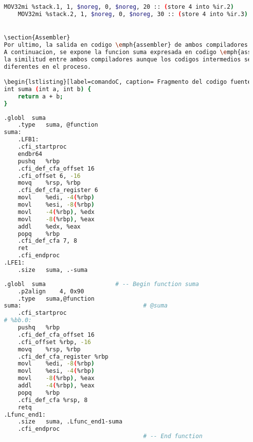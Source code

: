 \begin{lstlisting}[label=comandoC, caption= Fragmento de MachineInstr de CLANG/LLVM del archivo machineinstrs. \cite{repositorio}, language=bash]
    MOV32mi %stack.1, 1, $noreg, 0, $noreg, 20 :: (store 4 into %ir.2)
    MOV32mi %stack.2, 1, $noreg, 0, $noreg, 30 :: (store 4 into %ir.3) \end{lstlisting}


\section{Assembler}
Por ultimo, la salida en codigo \emph{assembler} de ambos compiladores es practicamente la misma. 
A continuacion, se expone la funcion suma expresada en codigo \emph{assembler} destacando 
la similitud entre ambos compiladores aunque los codigos intermedios sean notoriamente 
diferentes en el proceso.

\begin{lstlisting}[label=comandoC, caption= Fragmento del codigo fuente del archivo codigo-ejemplo.c. \cite{repositorio}, language=bash]
int suma (int a, int b) {
    return a + b;
}   \end{lstlisting}

\begin{lstlisting}[label=comandoC, caption= Fragmento del codigo \emph{assembler} de GCC del archivo codigo-ejemplo.s. \cite{repositorio}, language=bash]
    .globl	suma
    .type	suma, @function
suma:
    .LFB1:
    .cfi_startproc
    endbr64
    pushq	%rbp
    .cfi_def_cfa_offset 16
    .cfi_offset 6, -16
    movq	%rsp, %rbp
    .cfi_def_cfa_register 6
    movl	%edi, -4(%rbp)
    movl	%esi, -8(%rbp)
    movl	-4(%rbp), %edx
    movl	-8(%rbp), %eax
    addl	%edx, %eax
    popq	%rbp
    .cfi_def_cfa 7, 8
    ret
    .cfi_endproc
.LFE1:
    .size	suma, .-suma    \end{lstlisting}

\begin{lstlisting}[label=comandoC, caption= Fragmento del codigo \emph{assembler} de CLANG/LLVM del archivo assembly.s. \cite{repositorio}, language=bash]
	.globl	suma                    # -- Begin function suma
	.p2align	4, 0x90
	.type	suma,@function
suma:                                   # @suma
	.cfi_startproc
# %bb.0:
	pushq	%rbp
	.cfi_def_cfa_offset 16
	.cfi_offset %rbp, -16
	movq	%rsp, %rbp
	.cfi_def_cfa_register %rbp
	movl	%edi, -8(%rbp)
	movl	%esi, -4(%rbp)
	movl	-8(%rbp), %eax
	addl	-4(%rbp), %eax
	popq	%rbp
	.cfi_def_cfa %rsp, 8
	retq
.Lfunc_end1:
	.size	suma, .Lfunc_end1-suma
	.cfi_endproc
                                        # -- End function   \end{lstlisting}